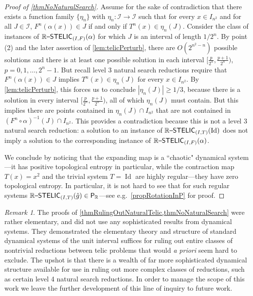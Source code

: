 \documentclass{amsart}
\theoremstyle{theorem}
\theoremstyle{remark}
\newtheorem{remark}[theorem]{Remark}
\DeclareMathOperator{\Id}{Id}
\newcommand{\RR}{\mathbb{R}}
\newcommand{\ccP}{\textsf{\upshape P}}
\newcommand{\ccRSTELIC}{\mathbb{R}\textsf{\upshape --STELIC}}
\newcommand{\cI}{\mathcal{I}}
\begin{document}
\begin{proof}[Proof of \cref{thmNoNaturalSearch}]
Assume for the sake of contradiction that there exists a function family $\{\eta_n\}$ with $\eta_n:\cI\rightarrow \cI$ such that for every $x \in I_{n^2}$ and for all $J \in \cI$, $F^n(\alpha(x)) \in J$ if and only if $T^n(x) \in \eta_n(J)$. Consider the class of instances of $\ccRSTELIC_{(I, F)}(\alpha)$ for which $J$ is an interval of length $1/2^n$. By point (2) and the later assertion of \cref{lem:telicPerturb}, there are $O(2^{n^2-n})$ possible solutions and there is at least one possible solution in each interval $[\frac{p}{2^n}, \frac{p+1}{2^n})$, $p=0,1,\dots,2^n-1$. But recall level 3 natural search reductions require that $F^n(\alpha(x)) \in J$ implies $T^n(x) \in \eta_n(J)$ for every $x \in I_{n^2}$. By \cref{lem:telicPerturb}, this forces us to conclude $|\eta_n(J)|\geq 1/3$, because there is a solution in every interval $[\frac{p}{2^n}, \frac{p+1}{2^n})$, all of which $\eta_n(J)$ must contain. But this implies there are points contained in $\eta_n(J) \cap I_{n^2}$ that are not contained in $(F^n\circ \alpha)^{-1}(J) \cap I_{n^2}$. This provides a contradiction because this is not a level 3 natural search reduction: a solution to an instance of $\ccRSTELIC_{(I, T)}(\Id)$ does not imply a solution to the corresponding instance of $\ccRSTELIC_{(I, F)}(\alpha)$.

We conclude by noticing that the expanding map is a ``chaotic" dynamical system---it has positive topological entropy in particular, while the contraction map $T(x)=x^2$ and the trivial system $T = \Id$ are highly regular---they have zero topological entropy. In particular, it is not hard to see that for such regular systems $\ccRSTELIC_{(I, T)}(\hat{g}) \in \ccP_\RR$---see e.g.\ \cref{propRotationInP} for proof.
\end{proof}

\begin{remark}
The proofs of \cref{thmRulingOutNaturalTelic,thmNoNaturalSearch} were rather elementary, and did not use any sophisticated results from dynamical systems. They demonstrated the elementary theory and structure of standard dynamical systems of the unit interval suffices for ruling out entire classes of nontrivial reductions between telic problems that would \emph{a priori} seem hard to exclude. The upshot is that there is a wealth of far more sophisticated dynamical structure available for use in ruling out more complex classes of reductions, such as certain level 4 natural search reductions. In order to manage the scope of this work we leave the further development of this line of inquiry to future work.
\end{remark}
\end{document}
